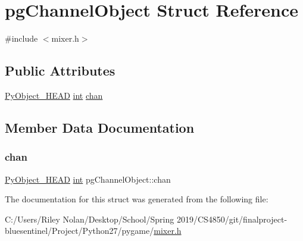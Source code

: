 \hypertarget{structpg_channel_object}{}\section{pg\+Channel\+Object Struct Reference}
\label{structpg_channel_object}


{\ttfamily \#include $<$mixer.\+h$>$}

\subsection*{Public Attributes}
\begin{DoxyCompactItemize}
\item 
\mbox{\hyperlink{_python27_2object_8h_a0bf35c1f3ea13f925de94d8593db3b7e}{Py\+Object\+\_\+\+H\+E\+AD}} \mbox{\hyperlink{warnings_8h_a74f207b5aa4ba51c3a2ad59b219a423b}{int}} \mbox{\hyperlink{structpg_channel_object_a43d3dc6d9fb52bfa0c7eff2ba5d298bd}{chan}}
\end{DoxyCompactItemize}


\subsection{Member Data Documentation}
\mbox{\label{structpg_channel_object_a43d3dc6d9fb52bfa0c7eff2ba5d298bd}} 
\subsubsection{\texorpdfstring{chan}{chan}}
{\footnotesize\ttfamily \mbox{\hyperlink{_python27_2object_8h_a0bf35c1f3ea13f925de94d8593db3b7e}{Py\+Object\+\_\+\+H\+E\+AD}} \mbox{\hyperlink{warnings_8h_a74f207b5aa4ba51c3a2ad59b219a423b}{int}} pg\+Channel\+Object\+::chan}



The documentation for this struct was generated from the following file\+:\begin{DoxyCompactItemize}
\item 
C\+:/\+Users/\+Riley Nolan/\+Desktop/\+School/\+Spring 2019/\+C\+S4850/git/finalproject-\/bluesentinel/\+Project/\+Python27/pygame/\mbox{\hyperlink{mixer_8h}{mixer.\+h}}\end{DoxyCompactItemize}
